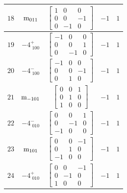 \documentclass[fleqn,8pt]{jsarticle}
\begin{document}
\begin{longtable}{ccccc}
$ 18 $ & $ {\rm m}_{011} $ & $ \begin{bmatrix} 1 & 0 & 0 \\ 0 & 0 & -1 \\ 0 & -1 & 0 \end{bmatrix} $ & $ -1 $ & $ 1 $ \\ \hline
$ 19 $ & $ -4^{+}_{\,\,100} $ & $ \begin{bmatrix} -1 & 0 & 0 \\ 0 & 0 & 1 \\ 0 & -1 & 0 \end{bmatrix} $ & $ -1 $ & $ 1 $ \\ \hline
$ 20 $ & $ -4^{-}_{\,\,100} $ & $ \begin{bmatrix} -1 & 0 & 0 \\ 0 & 0 & -1 \\ 0 & 1 & 0 \end{bmatrix} $ & $ -1 $ & $ 1 $ \\ \hline
$ 21 $ & $ {\rm m}_{-101} $ & $ \begin{bmatrix} 0 & 0 & 1 \\ 0 & 1 & 0 \\ 1 & 0 & 0 \end{bmatrix} $ & $ -1 $ & $ 1 $ \\ \hline
$ 22 $ & $ -4^{-}_{\,\,010} $ & $ \begin{bmatrix} 0 & 0 & 1 \\ 0 & -1 & 0 \\ -1 & 0 & 0 \end{bmatrix} $ & $ -1 $ & $ 1 $ \\ \hline
$ 23 $ & $ {\rm m}_{101} $ & $ \begin{bmatrix} 0 & 0 & -1 \\ 0 & 1 & 0 \\ -1 & 0 & 0 \end{bmatrix} $ & $ -1 $ & $ 1 $ \\ \hline
$ 24 $ & $ -4^{+}_{\,\,010} $ & $ \begin{bmatrix} 0 & 0 & -1 \\ 0 & -1 & 0 \\ 1 & 0 & 0 \end{bmatrix} $ & $ -1 $ & $ 1 $ \\
\end{longtable}
\end{document}
